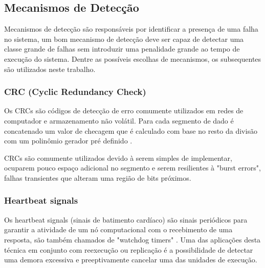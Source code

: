 \subsection{Mecanismos de Detecção}

Mecanismos de detecção são responsáveis por identificar a presença de uma falha no sistema, um bom mecanismo de detecção deve ser capaz de detectar uma classe grande de falhas sem introduzir uma penalidade grande ao tempo de execução do sistema. Dentre as possíveis escolhas de mecanismos, os subsequentes são utilizados neste trabalho.

\subsubsection{CRC (Cyclic Redundancy Check)}

Os CRCs são códigos de detecção de erro comumente utilizados em redes de computador e armazenamento não volátil. Para cada segmento de dado é concatenado um valor de checagem que é calculado com base no resto da divisão com um polinômio gerador pré definido \cite{FaultTolerantSystems}.

CRCs são comumente utilizados devido à serem simples de implementar, ocuparem pouco espaço adicional no segmento e serem resilientes à "burst errors", falhas transientes que alteram uma região de bits próximos.

\subsubsection{Heartbeat signals}

Os heartbeat signals (sinais de batimento cardíaco) são sinais periódicos para garantir a atividade de um nó computacional com o recebimento de uma resposta, são também chamados de "watchdog timers" \cite{DependabilityInEmbeddedSystems}. Uma das aplicações desta técnica em conjunto com reexecução ou replicação é a possibilidade de detectar uma demora excessiva e preeptivamente cancelar uma das unidades de execução.

